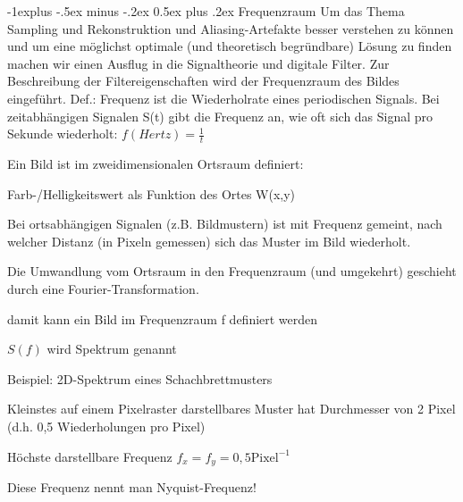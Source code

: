\documentclass[landscape]{article}
\makeatletter
\renewcommand{\subsection}{\@startsection{subsection}{2}{0mm}%
                                {-1explus -.5ex minus -.2ex}%
                                {0.5ex plus .2ex}%
                                {\normalfont\normalsize\bfseries}}
\makeatother
\begin{document}
\begin{multicols}{3}
  
  \subsection{Frequenzraum}
  Um das Thema Sampling und Rekonstruktion und Aliasing-Artefakte besser verstehen zu können und um eine möglichst optimale (und theoretisch begründbare) Lösung zu finden machen wir einen Ausflug in die Signaltheorie und digitale Filter.
  Zur Beschreibung der Filtereigenschaften wird der Frequenzraum des Bildes eingeführt.
  Def.: Frequenz ist die Wiederholrate eines periodischen Signals. Bei zeitabhängigen Signalen S(t) gibt die Frequenz an, wie oft sich das Signal pro Sekunde wiederholt: $f(Hertz)=\frac{1}{t}$
  
  Ein Bild ist im zweidimensionalen Ortsraum definiert:
  \begin{itemize*}
    \item Farb-/Helligkeitswert als Funktion des Ortes W(x,y)
    \item Bei ortsabhängigen Signalen (z.B. Bildmustern) ist mit Frequenz gemeint, nach welcher Distanz (in Pixeln gemessen) sich das Muster im Bild wiederholt.
    \item Die Umwandlung vom Ortsraum in den Frequenzraum (und umgekehrt) geschieht durch eine Fourier-Transformation.
    \begin{itemize*}
      \item damit kann ein Bild im Frequenzraum f definiert werden
      \item $S(f)$ wird Spektrum genannt
    \end{itemize*}
  \end{itemize*}
  
  
  Beispiel: 2D-Spektrum eines Schachbrettmusters
  \begin{itemize*}
    \item Kleinstes auf einem Pixelraster darstellbares Muster hat Durchmesser von 2 Pixel (d.h. 0,5 Wiederholungen pro Pixel)
    \item Höchste darstellbare Frequenz $f_x = f_y = 0,5 \text{Pixel}^{-1}$
    \item Diese Frequenz nennt man Nyquist-Frequenz!
  \end{itemize*}
  

\end{multicols}
\end{document}
